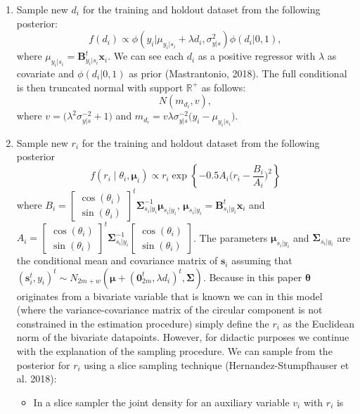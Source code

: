 \documentclass[12pt,]{article}
\begin{document}
\begin{enumerate}
\item Sample new $d_i$ for the training and holdout dataset from the following posterior:
$$f(d_i) \propto \phi(y_i|\mu_{y_i|s_i} + \lambda d_i, \sigma^2_{y|s})\phi(d_i|0, 1),$$
where $\mu_{y_i|s_i} = \boldsymbol{B}_{y_i|s_i}^t\boldsymbol{x}_i$. We can see each $d_i$ as a positive regressor with $\lambda$ as covariate and $\phi(d_i|0, 1)$ as prior (Mastrantonio, 2018). The full conditional is then truncated normal with support $\mathbb{R}^{+}$ as follows:
$$N(m_{d_i}, v),$$ 
\noindent where $v = \big(\lambda^2\sigma^{-2}_{y|s} + 1\big)$ and $m_{d_i} = v\lambda\sigma^{-2}_{y|s}\big(y_i - \mu_{y_i|s_i}\big)$. 
\item Sample new $r_i$ for the training and holdout dataset from the following posterior
$$f(r_i \mid \theta_i, \boldsymbol{\mu}_i) \propto r_i \exp{\left\{-0.5A_i\bigg(r_i-\frac{B_i}{A_i}\bigg)^2\right\}}$$ 
where $B_i = \begin{bmatrix} \cos (\theta_i) \\ \sin (\theta_i)\end{bmatrix}^t\boldsymbol{\Sigma}_{s_i|y_i}^{-1}\boldsymbol{\mu}_{s_i|y_i}$, $\boldsymbol{\mu}_{s_i|y_i} = \boldsymbol{B}_{s_i|y_i}^t\boldsymbol{x}_i$ and $A_i = \begin{bmatrix} \cos (\theta_i) \\ \sin (\theta_i)\end{bmatrix}^t\boldsymbol{\Sigma}_{s_i| y_i}^{-1}\begin{bmatrix} \cos (\theta_i) \\ \sin (\theta_i)\end{bmatrix}$. The parameters $\boldsymbol{\mu}_{s_i|y_i}$ and $\boldsymbol{\Sigma}_{s_i| y_i}$ are the conditional mean and covariance matrix of $\boldsymbol{s}_i$ assuming that $(\boldsymbol{s}_i^t, y_i)^t \sim N_{2m+w}(\boldsymbol{\mu} + (\boldsymbol{0}_{2m}^t, \lambda d_i)^t, \boldsymbol{\Sigma})$. 
Because in this paper $\boldsymbol{\theta}$ originates from a bivariate variable that is known we can in this model (where the variance-covariance matrix of the circular component is not constrained in the estimation procedure) simply define the $r_i$ as the Euclidean norm of the bivariate datapoints. However, for didactic purposes we continue with the explanation of the sampling procedure. We
can sample from the posterior for $r_i$ using a slice sampling technique (Hernandez-Stumpfhauser et al. 2018): 
\begin{itemize}
\item In a slice sampler the joint density for an auxiliary variable $v_{i}$ with $r_{i}$ is

\end{itemize}
\end{enumerate}
\end{document}
